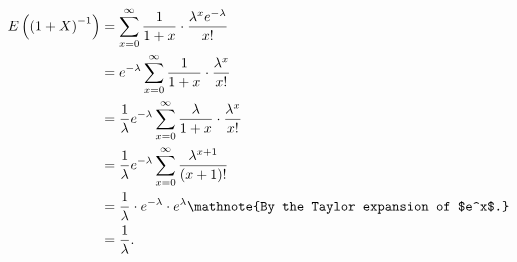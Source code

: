 \documentclass{abrice}
\begin{document}
\bigskip

\begin{align*}
  E\left( {(1+X)}^{-1} \right)
  &= \sum_{x=0}^{\infty} {1 \over 1 + x} \cdot { \lambda^x
    e^{-\lambda} \over x! }\\
  &= e^{-\lambda} \sum_{x=0}^{\infty} {1 \over 1 + x} \cdot {
    \lambda^x \over x!}\\
  &= {1 \over \lambda} e^{-\lambda} \sum_{x=0}^{\infty} { \lambda
    \over 1 + x} \cdot { \lambda^x \over x! }\\
  &= {1 \over \lambda} e^{-\lambda} \sum_{x=0}^{\infty} {
    \lambda^{x+1} \over (x+1)! }\\
  &= {1 \over \lambda} \cdot e^{-\lambda} \cdot e^{\lambda}
    \mathnote{By the Taylor expansion of $e^x$.}\\
  &= {1 \over \lambda}.
\end{align*}
\end{document}
